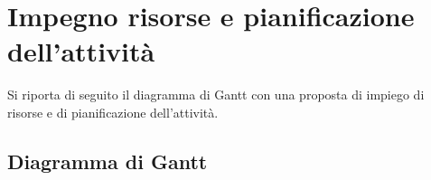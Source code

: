%
%	 
%

\chapter{Impegno risorse e pianificazione dell'attività}

Si riporta di seguito il diagramma di Gantt con una proposta di impiego di risorse e di pianificazione
dell'attività.

\section{Diagramma di Gantt}


